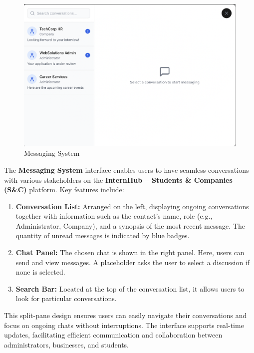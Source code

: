 \begin{figure}[H]
    \begin{center}
        \includegraphics[width=0.70\linewidth]{JhaBhatiaSharma/imagesDD/MessagingSystem.png}
        \caption{Messaging System}
        \label{fig:messagingSystme}
    \end{center}
\end{figure}

The \textbf{Messaging System} interface enables users to have seamless conversations with various stakeholders on the \textbf{InternHub – Students \& Companies (S\&C)} platform. Key features include:
\begin{enumerate}
    \item \textbf{Conversation List:} Arranged on the left, displaying ongoing conversations together with information such as the contact's name, role (e.g., Administrator, Company), and a synopsis of the most recent message. The quantity of unread messages is indicated by blue badges.
    \item \textbf{Chat Panel:} The chosen chat is shown in the right panel. Here, users can send and view messages. A placeholder asks the user to select a discussion if none is selected.
    \item \textbf{Search Bar:} Located at the top of the conversation list, it allows users to look for particular conversations.
\end{enumerate}

This split-pane design ensures users can easily navigate their conversations and focus on ongoing chats without interruptions. The interface supports real-time updates, facilitating efficient communication and collaboration between administrators, businesses, and students.

